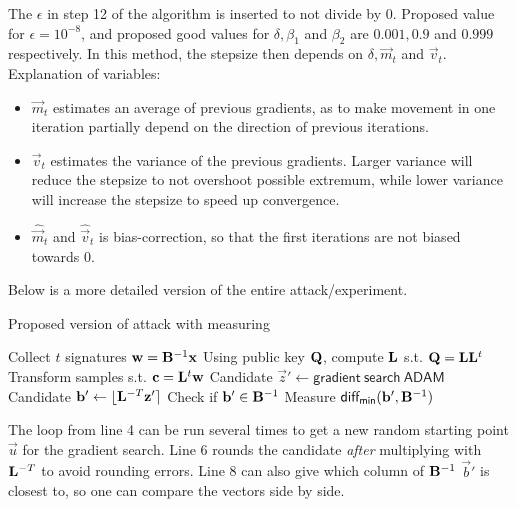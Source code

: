 The $\epsilon$ in step 12 of the algorithm is inserted to not divide by 0. Proposed value for $\epsilon = 10^{-8}$,
and proposed good values for $\delta, \beta_1$ and $\beta_2$ are $0.001, 0.9$ and $0.999$ respectively.
In this method, the stepsize then depends on $\delta, \vec{m}_t$ and $\vec{v}_t$.
Explanation of variables:
\begin{itemize}
    \item $\vec{m}_t$ estimates an average of previous gradients, as to make movement in one iteration partially depend on the direction of previous iterations.
    \item $\vec{v}_t$ estimates the variance of the previous gradients. Larger variance will reduce the stepsize to not overshoot possible extremum, while lower variance will increase the stepsize to speed up convergence.
    \item $\hat{\vec{m}}_t$ and $\hat{\vec{v}}_t$ is bias-correction, so that the first iterations are not biased towards 0.
\end{itemize}

Below is a more detailed version of the entire attack/experiment.
\begin{algorithm}[H]
\caption{Proposed version of attack with measuring}
\begin{algorithmic}[1]
    \State Collect $t$ signatures $\mathbf{w} = \mathbf{B}^{-1} \mathbf{x}$ 
    \State Using public key $\mathbf{Q}$, compute $\mathbf{L}$ s.t. $\mathbf{Q} = \mathbf{L} \mathbf{L}^t$
    \State Transform samples s.t. $\mathbf{c} = \mathbf{L}^t \mathbf{w}$
    \Loop
    \State Candidate $\vec{z}' \gets \mathsf{gradient \ search  \ ADAM}$ 
    \State Candidate $\mathbf{b}' \gets \lfloor \mathbf{L}^{-T} \mathbf{z}' \rceil$ 
    \State Check if $\mathbf{b}' \in \mathbf{B}^{-1}$
    \State Measure $\mathsf{diff_{min}}(\mathbf{b}', \mathbf{B}^{-1})$
    \EndLoop
\end{algorithmic}
\end{algorithm}

The loop from line 4 can be run several times to get a new random starting point $\vec{u}$ for the gradient search.
Line 6 rounds the candidate \textit{after} multiplying with $\mathbf{L}^{-T}$ to avoid rounding errors.
Line 8 can also give which column of $\mathbf{B}^{-1}$ $\vec{b}'$ is closest to, so one can compare the vectors side by side.

